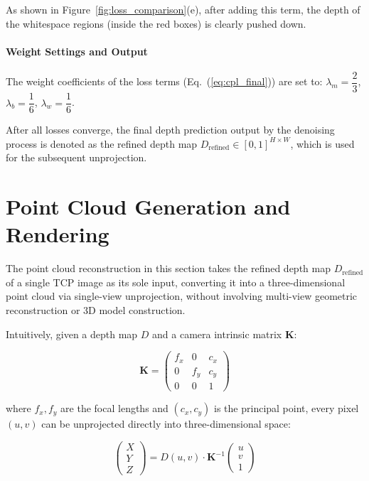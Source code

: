 As shown in Figure~\ref{fig:loss_comparison}(e), after adding this term, the depth of the whitespace regions (inside the red boxes) is clearly pushed down.

\paragraph{Weight Settings and Output}
The weight coefficients of the loss terms (Eq.~(\ref{eq:cpl_final})) are set to:
$\lambda_m = \dfrac{2}{3}$, $\lambda_b = \dfrac{1}{6}$, $\lambda_w = \dfrac{1}{6}$.

After all losses converge, the final depth prediction output by the denoising process is denoted as the refined depth map
$D_{\mathrm{refined}} \in [0,1]^{H \times W}$, which is used for the subsequent unprojection.

\section{Point Cloud Generation and Rendering}
\label{sec:pointcloud}

The point cloud reconstruction in this section takes the refined depth map $D_{\mathrm{refined}}$ of a single TCP image as its sole input,
converting it into a three-dimensional point cloud via single-view unprojection,
without involving multi-view geometric reconstruction or 3D model construction.

Intuitively, given a depth map $D$ and a camera intrinsic matrix $\mathbf{K}$:

\begin{equation}
  \mathbf{K} =
  \begin{pmatrix} f_x & 0 & c_x \\ 0 & f_y & c_y \\ 0 & 0 & 1 \end{pmatrix}
\end{equation}

where $f_x, f_y$ are the focal lengths and $(c_x, c_y)$ is the principal point,
every pixel $(u,v)$ can be unprojected directly into three-dimensional space:

\begin{equation}
  \begin{pmatrix} X \\ Y \\ Z \end{pmatrix} =
  D(u,v) \cdot \mathbf{K}^{-1}
  \begin{pmatrix} u \\ v \\ 1 \end{pmatrix}
\end{equation}

